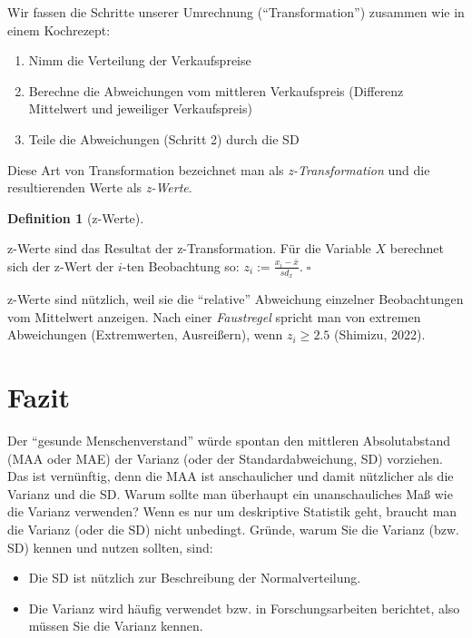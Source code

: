 \documentclass[
  letterpaper,
  twoside,
  open=any]{scrbook}
\providecommand{\tightlist}{%
  \setlength{\itemsep}{0pt}\setlength{\parskip}{0pt}}\usepackage{longtable,booktabs,array}
\theoremstyle{definition}
\newtheorem{definition}{Definition}[chapter]
\theoremstyle{definition}
\theoremstyle{definition}
\theoremstyle{remark}
\begin{document}
Wir fassen die Schritte unserer Umrechnung (\enquote{Transformation})
zusammen wie in einem Kochrezept:

\begin{enumerate}
\def\labelenumi{\arabic{enumi}.}
\tightlist
\item
  Nimm die Verteilung der Verkaufspreise
\item
  Berechne die Abweichungen vom mittleren Verkaufspreis (Differenz
  Mittelwert und jeweiliger Verkaufspreis)
\item
  Teile die Abweichungen (Schritt 2) durch die SD
\end{enumerate}

Diese Art von Transformation bezeichnet man als \emph{z-Transformation}
und die resultierenden Werte als \emph{z-Werte}.

\begin{definition}[z-Werte]\protect\hypertarget{def-z-werte}{}\label{def-z-werte}

z-Werte sind das Resultat der z-Transformation. Für die Variable \(X\)
berechnet sich der z-Wert der \(i\)-ten Beobachtung so:
\(z_i := \frac{x_i - \bar{x}}{sd_x}.\;\square\)

\end{definition}

z-Werte sind nützlich, weil sie die \enquote{relative} Abweichung
einzelner Beobachtungen vom Mittelwert anzeigen. Nach einer
\emph{Faustregel} spricht man von extremen Abweichungen (Extremwerten,
Ausreißern), wenn \(z_i \ge 2.5\) (Shimizu, 2022).

\section{Fazit}\label{fazit-2}

Der \enquote{gesunde Menschenverstand} würde spontan den mittleren
Absolutabstand (MAA oder MAE) der Varianz (oder der Standardabweichung,
SD) vorziehen. Das ist vernünftig, denn die MAA ist anschaulicher und
damit nützlicher als die Varianz und die SD. Warum sollte man überhaupt
ein unanschauliches Maß wie die Varianz verwenden? Wenn es nur um
deskriptive Statistik geht, braucht man die Varianz (oder die SD) nicht
unbedingt. Gründe, warum Sie die Varianz (bzw. SD) kennen und nutzen
sollten, sind:

\begin{itemize}
\tightlist
\item
  Die SD ist nützlich zur Beschreibung der Normalverteilung.
\item
  Die Varianz wird häufig verwendet bzw. in Forschungsarbeiten
  berichtet, also müssen Sie die Varianz kennen.
\end{itemize}
\end{document}
